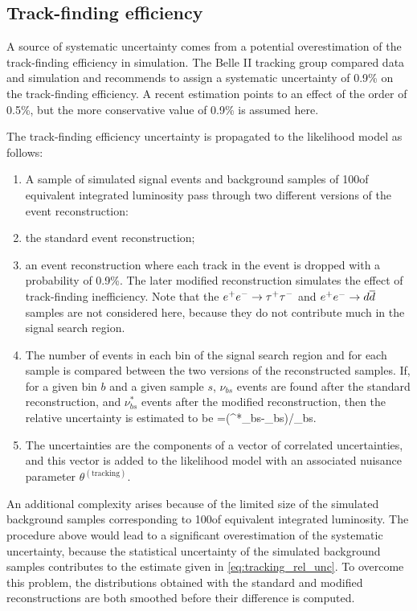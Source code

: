\subsection{Track-finding efficiency} \label{sec:syst_tracking}
A source of systematic uncertainty comes from a potential overestimation of the track-finding efficiency in simulation.
The Belle II tracking group compared data and simulation and recommends to assign a systematic uncertainty of 0.9\% on the track-finding efficiency.
A recent estimation points to an effect of the order of 0.5\%, but the more conservative value of 0.9\% is assumed here.

The track-finding efficiency uncertainty is propagated to the likelihood model as follows:
\begin{enumerate}
\item A sample of \nsignalmctest simulated signal events and background samples of 100\invfb of equivalent integrated luminosity pass through two different versions of the event reconstruction:
\bi
\item the standard event reconstruction;
\item an event reconstruction where each track in the event is dropped with a probability of 0.9\%.
\ei
The later modified reconstruction simulates the effect of track-finding inefficiency.
Note that the $e^+e^-\rightarrow\tau^+\tau^-$ and $e^+e^-\rightarrow d\overline d$ samples are not considered here, because they do not contribute much in the signal search region.
\item The number of events in each bin of the signal search region and for each sample is compared between the two versions of the reconstructed samples.
If, for a given bin $b$ and a given sample $s$, $\nu_{bs}$ events are found after the standard reconstruction, and $\nu^*_{bs}$ events after the modified reconstruction, then the relative uncertainty is estimated to be
\be \label{eq:tracking_rel_unc}
=(\nu^*_{bs}-\nu_{bs})/\nu_{bs}.
\ee
\item The uncertainties are the components of a vector of correlated uncertainties, and this vector is added to the likelihood model with an associated nuisance parameter $\theta^{(\text{tracking})}$.
\end{enumerate}
An additional complexity arises because of the limited size of the simulated background samples corresponding to 100\invfb of equivalent integrated luminosity.
The procedure above would lead to a significant overestimation of the systematic uncertainty, because the statistical uncertainty of the simulated background samples contributes to the estimate given in \cref{eq:tracking_rel_unc}.
To overcome this problem, the distributions obtained with the standard and modified reconstructions are both smoothed before their difference is computed.

